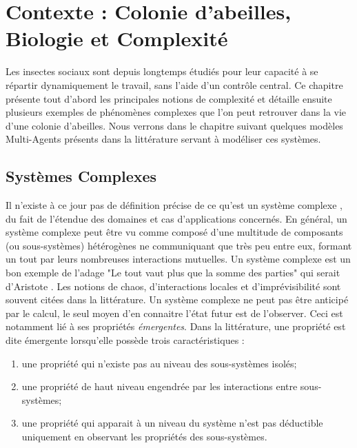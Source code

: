 \chapter{Contexte : Colonie d'abeilles, Biologie et Complexité}
\label{ChapitreContexte}
	
	Les insectes sociaux sont depuis longtemps étudiés pour leur capacité à se répartir dynamiquement le travail, sans l'aide d'un contrôle central. Ce chapitre présente tout d'abord les principales notions de complexité et détaille ensuite plusieurs exemples de phénomènes complexes que l'on peut retrouver dans la vie d'une colonie d'abeilles. Nous verrons dans le chapitre suivant quelques modèles Multi-Agents présents dans la littérature servant à modéliser ces systèmes.

	
		\section{Systèmes Complexes}
		
			Il n'existe à ce jour pas de définition précise de ce qu'est un système complexe \cite{heylighen_complexity_2008}, du fait de l'étendue des domaines et cas d'applications concernés. En général, un système complexe peut être vu comme composé d'une multitude de composants (ou sous-systèmes) hétérogènes ne communiquant que très peu entre eux, formant un tout par leurs nombreuses interactions mutuelles. Un système complexe est un bon exemple de l'adage "Le tout vaut plus que la somme des parties" qui serait d'Aristote \cite{edmonds_what_1995}. Les notions de chaos, d'interactions locales et d'imprévisibilité sont souvent citées dans la littérature. Un système complexe ne peut pas être anticipé par le calcul, le seul moyen d'en connaitre l'état futur est de l'observer. 
			Ceci est notamment lié à ses propriétés \textit{émergentes}. Dans la littérature, une propriété est dite émergente lorsqu'elle possède trois caractéristiques \cite{breckling_emergent_2005} :
			\begin{enumerate}
				\item une propriété qui n'existe pas au niveau des sous-systèmes isolés;
				\item une propriété de haut niveau engendrée par les interactions entre sous-systèmes;
				\item une propriété qui apparait à un niveau du système n'est pas déductible uniquement en observant les propriétés des sous-systèmes.
			\end{enumerate}
			
